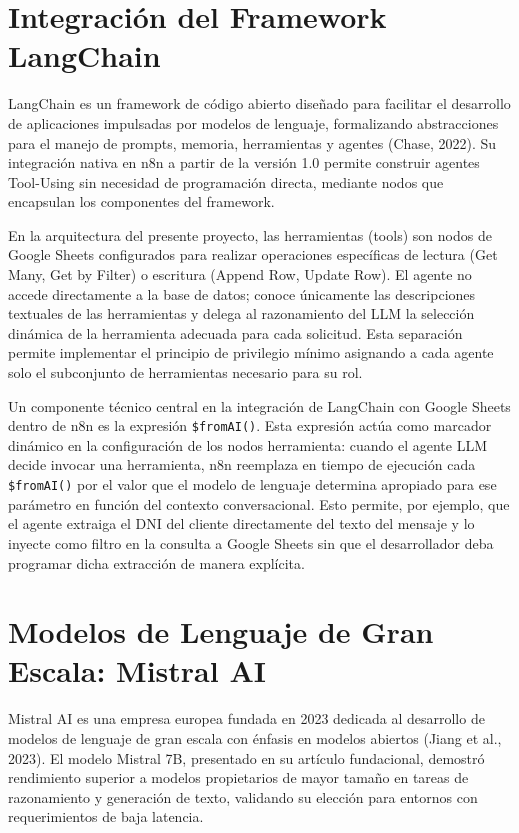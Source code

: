 \documentclass[12pt,a4paper]{report}
\begin{document}
\section{Integración del Framework LangChain}

LangChain es un framework de código abierto diseñado para facilitar el desarrollo de aplicaciones impulsadas por modelos de lenguaje, formalizando abstracciones para el manejo de prompts, memoria, herramientas y agentes (Chase, 2022). Su integración nativa en n8n a partir de la versión 1.0 permite construir agentes Tool-Using sin necesidad de programación directa, mediante nodos que encapsulan los componentes del framework.

En la arquitectura del presente proyecto, las herramientas (tools) son nodos de Google Sheets configurados para realizar operaciones específicas de lectura (Get Many, Get by Filter) o escritura (Append Row, Update Row). El agente no accede directamente a la base de datos; conoce únicamente las descripciones textuales de las herramientas y delega al razonamiento del LLM la selección dinámica de la herramienta adecuada para cada solicitud. Esta separación permite implementar el principio de privilegio mínimo asignando a cada agente solo el subconjunto de herramientas necesario para su rol.

Un componente técnico central en la integración de LangChain con Google Sheets dentro de n8n es la expresión \texttt{\$fromAI()}. Esta expresión actúa como marcador dinámico en la configuración de los nodos herramienta: cuando el agente LLM decide invocar una herramienta, n8n reemplaza en tiempo de ejecución cada \texttt{\$fromAI()} por el valor que el modelo de lenguaje determina apropiado para ese parámetro en función del contexto conversacional. Esto permite, por ejemplo, que el agente extraiga el DNI del cliente directamente del texto del mensaje y lo inyecte como filtro en la consulta a Google Sheets sin que el desarrollador deba programar dicha extracción de manera explícita.

\section{Modelos de Lenguaje de Gran Escala: Mistral AI}

Mistral AI es una empresa europea fundada en 2023 dedicada al desarrollo de modelos de lenguaje de gran escala con énfasis en modelos abiertos (Jiang et al., 2023). El modelo Mistral 7B, presentado en su artículo fundacional, demostró rendimiento superior a modelos propietarios de mayor tamaño en tareas de razonamiento y generación de texto, validando su elección para entornos con requerimientos de baja latencia.
\end{document}

